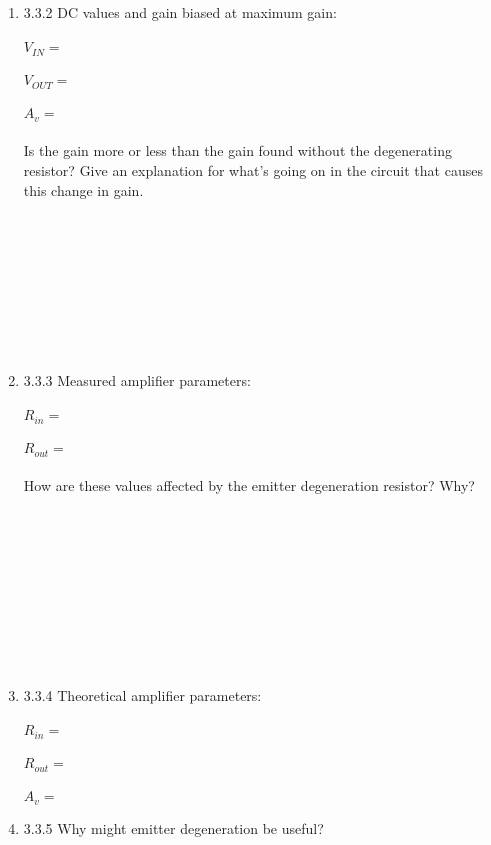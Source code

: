 \documentclass{article}
\begin{document}
\begin {enumerate}
	\item[3.3.2] DC values and gain biased at maximum gain:\\~\\
    	$\boxed{V_{IN}   = ~~~~~~~~~~~~~~~~~~~~~~~~~~~~~~~~~~~~~~}$ \\ ~ \\
	$\boxed{V_{OUT}  = ~~~~~~~~~~~~~~~~~~~~~~~~~~~~~~~~~~~~~}$ \\ ~ \\
    	$\boxed{A_{v}    = ~~~~~~~~~~~~~~~~~~~~~~~~~~~~~~~~~~~~~~}$ \\ ~ \\
	Is the gain more or less than the gain found without the degenerating resistor? Give an explanation for what's going on in the circuit that causes this change in gain.
	\\~\\~\\~\\~\\~\\~\\~\\~\\
        \item[3.3.3] Measured amplifier parameters:\\~\\
    	$\boxed{R_{in}   = ~~~~~~~~~~~~~~~~~~~~~~~~~~~~~~~~~~~~~~}$ \\ ~ \\
    	$\boxed{R_{out}  = ~~~~~~~~~~~~~~~~~~~~~~~~~~~~~~~~~~~~~~}$ \\ ~ \\
	How are these values affected by the emitter degeneration resistor? Why?
	\\~\\~\\~\\~\\~\\~\\~\\~\\~\\
        \item[3.3.4] Theoretical amplifier parameters:\\~\\
    	$\boxed{R_{in}   = ~~~~~~~~~~~~~~~~~~~~~~~~~~~~~~~~~~~~~~}$ \\ ~ \\
    	$\boxed{R_{out}  = ~~~~~~~~~~~~~~~~~~~~~~~~~~~~~~~~~~~~~~}$ \\ ~ \\
    	$\boxed{A_v  = ~~~~~~~~~~~~~~~~~~~~~~~~~~~~~~~~~~~~~~}$
	\item[3.3.5] Why might emitter degeneration be useful?
	\\~\\~\\~\\~\\~\\~\\~\\~\\


\end{enumerate}
\end{document}
